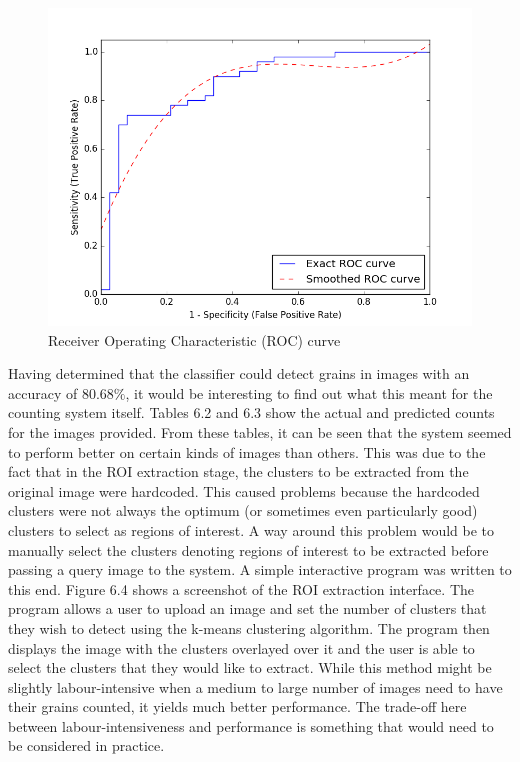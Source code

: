 \begin{figure}[ht!]
\centering
\includegraphics[scale=0.5]{Images/roc.png}
\caption{Receiver Operating Characteristic (ROC) curve}
\label{fig1}
\end{figure}
%
Having determined that the classifier could detect grains in images with an accuracy of $80.68\%$, it would be interesting to find out what this meant for the counting system itself. Tables 6.2 and 6.3 show the actual and predicted counts for the images provided. From these tables, it can be seen that the system seemed to perform better on certain kinds of images than others. This was due to the fact that in the ROI extraction stage, the clusters to be extracted from the original image were hardcoded. This caused problems because the hardcoded clusters were not always the optimum (or sometimes even particularly good) clusters to select as regions of interest. A way around this problem would be to manually select the clusters denoting regions of interest to be extracted before passing a query image to the system. A simple interactive program was written to this end. Figure 6.4 shows a screenshot of the ROI extraction interface. The program allows a user to upload an image and set the number of clusters that they wish to detect using the k-means clustering algorithm. The program then displays the image with the clusters overlayed over it and the user is able to select the clusters that they would like to extract. While this method might be slightly labour-intensive when a medium to large number of images need to have their grains counted, it yields much better performance. The trade-off here between labour-intensiveness and performance is something that would need to be considered in practice.
